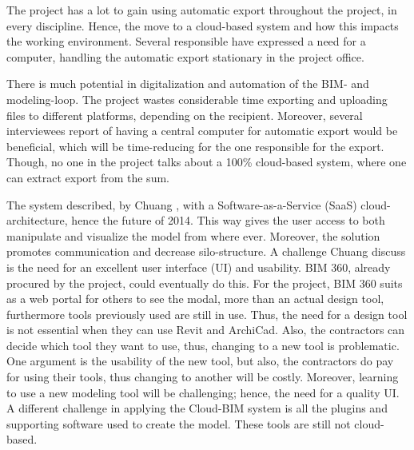 The project has a lot to gain using automatic export throughout the project, in every discipline. Hence, the move to a cloud-based system and how this impacts the working environment. Several responsible have expressed a need for a computer, handling the automatic export stationary in the project office. 

There is much potential in digitalization and automation of the BIM- and modeling-loop. The project wastes considerable time exporting and uploading files to different platforms, depending on the recipient. Moreover, several interviewees report of having a central computer for automatic export would be beneficial, which will be time-reducing for the one responsible for the export. Though, no one in the project talks about a 100\% cloud-based system, where one can extract export from the sum. 

The system described, by Chuang \cite{chuang2011applying}, with a Software-as-a-Service (SaaS) cloud-architecture, hence the future of 2014. This way gives the user access to both manipulate and visualize the model from where ever. Moreover, the solution promotes communication and decrease silo-structure. A challenge Chuang discuss is the need for an excellent user interface (UI) and usability. BIM 360, already procured by the project, could eventually do this. For the project, BIM 360 suits as a web portal for others to see the modal, more than an actual design tool, furthermore tools previously used are still in use. Thus, the need for a design tool is not essential when they can use Revit and ArchiCad. Also, the contractors can decide which tool they want to use, thus, changing to a new tool is problematic. One argument is the usability of the new tool, but also, the contractors do pay for using their tools, thus changing to another will be costly. Moreover, learning to use a new modeling tool will be challenging; hence, the need for a quality UI. A different challenge in applying the Cloud-BIM system is all the plugins and supporting software used to create the model. These tools are still not cloud-based.

